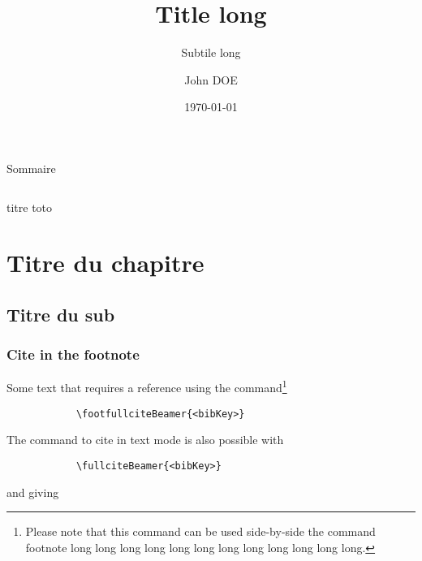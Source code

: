 \documentclass[notheorems, noamsthm, aspectratio=169, 10pt]{beamer}
\title[shorttitle]{Title long}
\subtitle[shortsubtitle]{Subtile long}
\date[shortdate]{\today}
\author[john.doe@mail.com]{John DOE\inst{1}}
\institute[shortinstitute]{\inst{1} An Awesome Company}
\begin{document}

{
	\begin{frame}[toc]{Sommaire}
		\begin{columns}
			\tableofcontents
		\end{columns}
	\end{frame}


	\begin{frame}{titre}
		toto
	\end{frame}
} 
 
\section{Titre du chapitre}
\subsection{Titre du sub}


\begin{frame}
	\frametitle{Cite in the footnote}

	Some text that requires a reference%
	using the command\footnote{Please note that this command can be used side-by-side the command footnote long long long long long long long long long long long long.}
	\begin{verbatim}
			\footfullciteBeamer{<bibKey>}
	\end{verbatim}

	The command to cite in text mode is also possible with
	\begin{verbatim}
			\fullciteBeamer{<bibKey>}
	\end{verbatim}
	and giving %
\end{frame}
\end{document}

